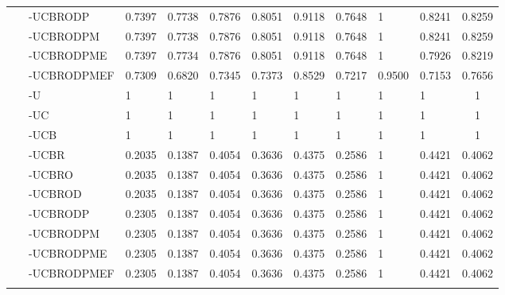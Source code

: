 \documentclass[10pt]{article}
\theoremstyle{remark}
\begin{document}
\begin{tabular}{cl||l|l|l|l|l|l|l|l||c}
		~ & -UCBRODP & 0.7397 & 0.7738 & 0.7876 & 0.8051 & 0.9118 & 0.7648 & 1 & 0.8241 & 0.8259 \\ \cline{2-11}
		~ & -UCBRODPM & 0.7397 & 0.7738 & 0.7876 & 0.8051 & 0.9118 & 0.7648 & 1 & 0.8241  & 0.8259 \\ \cline{2-11}
		~ & -UCBRODPME & 0.7397 & 0.7734 & 0.7876 & 0.8051 & 0.9118 & 0.7648 & 1 & 0.7926 & 0.8219 \\ \cline{2-11}
		~ & -UCBRODPMEF & 0.7309 & 0.6820 & 0.7345 & 0.7373 & 0.8529 & 0.7217 & 0.9500 & 0.7153 & 0.7656 \\ \hline \hline
		\multirow{10}{*}{\rotatebox[origin=c]{90}{\parbox[c]{4cm}{\centering \large Memory References }}} & -U & 1 & 1 & 1 & 1 & 1 & 1 & 1 & 1 & 1 \\ \cline{2-11}
		~ & -UC & 1 & 1 & 1 & 1 & 1 & 1 & 1 & 1 & 1 \\ \cline{2-11}
		~ & -UCB & 1 & 1 & 1 & 1 & 1 & 1 & 1 & 1 & 1 \\ \cline{2-11}
		~ & -UCBR & 0.2035 & 0.1387 & 0.4054 & 0.3636 & 0.4375 & 0.2586 & 1 & 0.4421 & 0.4062 \\ \cline{2-11}
		~ & -UCBRO & 0.2035 & 0.1387 & 0.4054 & 0.3636 & 0.4375 & 0.2586 & 1 & 0.4421 & 0.4062 \\ \cline{2-11}
		~ & -UCBROD & 0.2035 & 0.1387 & 0.4054 & 0.3636 & 0.4375 & 0.2586 & 1 & 0.4421 & 0.4062 \\ \cline{2-11}
		~ & -UCBRODP & 0.2305 & 0.1387 & 0.4054 & 0.3636 & 0.4375 & 0.2586 & 1 & 0.4421 & 0.4062 \\ \cline{2-11}
		~ & -UCBRODPM & 0.2305 & 0.1387 & 0.4054 & 0.3636 & 0.4375 & 0.2586 & 1 & 0.4421 & 0.4062 \\ \cline{2-11}
		~ & -UCBRODPME & 0.2305 & 0.1387 & 0.4054 & 0.3636 & 0.4375 & 0.2586  & 1 & 0.4421 & 0.4062 \\ \cline{2-11}
		~ & -UCBRODPMEF & 0.2305 & 0.1387 & 0.4054 & 0.3636 & 0.4375 & 0.2586 & 1 & 0.4421 & 0.4062 \\ \hhline{~==========}
	\end{tabular}
\end{document}
